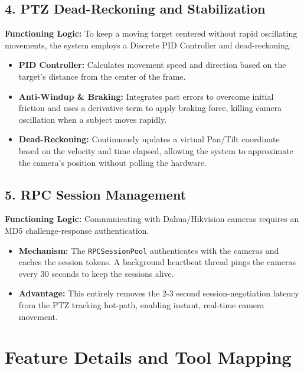 \documentclass{article}
\begin{document}
\subsection{4. PTZ Dead-Reckoning and Stabilization}
\textbf{Functioning Logic:} To keep a moving target centered without rapid oscillating movements, the system employs a Discrete PID Controller and dead-reckoning.
\begin{itemize}
    \item \textbf{PID Controller:} Calculates movement speed and direction based on the target's distance from the center of the frame. 
    \item \textbf{Anti-Windup \& Braking:} Integrates past errors to overcome initial friction and uses a derivative term to apply braking force, killing camera oscillation when a subject moves rapidly.
    \item \textbf{Dead-Reckoning:} Continuously updates a virtual Pan/Tilt coordinate based on the velocity and time elapsed, allowing the system to approximate the camera's position without polling the hardware.
\end{itemize}

\subsection{5. RPC Session Management}
\textbf{Functioning Logic:} Communicating with Dahua/Hikvision cameras requires an MD5 challenge-response authentication.
\begin{itemize}
    \item \textbf{Mechanism:} The \texttt{RPCSessionPool} authenticates with the cameras and caches the session tokens. A background heartbeat thread pings the cameras every 30 seconds to keep the sessions alive.
    \item \textbf{Advantage:} This entirely removes the 2-3 second session-negotiation latency from the PTZ tracking hot-path, enabling instant, real-time camera movement.
\end{itemize}

\section{Feature Details and Tool Mapping}
\end{document}
